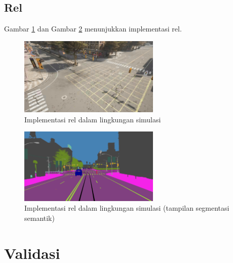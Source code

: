 \subsection{Rel}

Gambar \ref{fig:rel} dan Gambar \ref{fig:rel-2} menunjukkan implementasi rel.



\begin{figure}[ht]
    \centering
    \includegraphics[width=0.6\textwidth]{resources/chapter-4/rel.png}
    \caption{Implementasi rel dalam lingkungan simulasi}
    \label{fig:rel}
\end{figure}

\begin{figure}[ht]
    \centering
    \includegraphics[width=0.6\textwidth]{resources/chapter-4/rel-segmentation-camera.png}
    \caption{Implementasi rel dalam lingkungan simulasi (tampilan segmentasi semantik)}
    \label{fig:rel-2}
\end{figure}

\section{Validasi}

